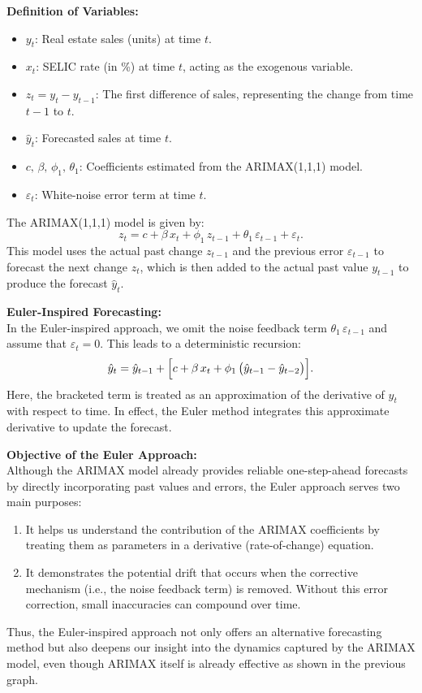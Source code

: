 \documentclass{article}
\begin{document}
\textbf{Definition of Variables:}
\begin{itemize}
    \item \(y_t\): Real estate sales (units) at time \(t\).
    \item \(x_t\): SELIC rate (in \%) at time \(t\), acting as the exogenous variable.
    \item \(z_t = y_t - y_{t-1}\): The first difference of sales, representing the change from time \(t-1\) to \(t\).
    \item \(\hat{y}_t\): Forecasted sales at time \(t\).
    \item \(c,\,\beta,\,\phi_1,\,\theta_1\): Coefficients estimated from the ARIMAX(1,1,1) model.
    \item \(\varepsilon_t\): White-noise error term at time \(t\).
\end{itemize}


The ARIMAX(1,1,1) model is given by:
\[
z_t = c + \beta\,x_t + \phi_1\,z_{t-1} + \theta_1\,\varepsilon_{t-1} + \varepsilon_t.
\]
This model uses the actual past change \(z_{t-1}\) and the previous error \(\varepsilon_{t-1}\) to forecast the next change \(z_t\), which is then added to the actual past value \(y_{t-1}\) to produce the forecast \(\hat{y}_t\).

\textbf{Euler-Inspired Forecasting:}\\[1mm]
In the Euler-inspired approach, we omit the noise feedback term \(\theta_1\,\varepsilon_{t-1}\) and assume that \(\varepsilon_t = 0\). This leads to a deterministic recursion:
\[
\hat{y}_t = \hat{y}_{t-1} + \Bigl[c + \beta\,x_t + \phi_1\,\bigl(\hat{y}_{t-1} - \hat{y}_{t-2}\bigr)\Bigr].
\]
Here, the bracketed term is treated as an approximation of the derivative of \(y_t\) with respect to time. In effect, the Euler method integrates this approximate derivative to update the forecast.

\textbf{Objective of the Euler Approach:}\\[1mm]
Although the ARIMAX model already provides reliable one-step-ahead forecasts by directly incorporating past values and errors, the Euler approach serves two main purposes:
\begin{enumerate}
    \item It helps us understand the contribution of the ARIMAX coefficients by treating them as parameters in a derivative (rate-of-change) equation.
    \item It demonstrates the potential drift that occurs when the corrective mechanism (i.e., the noise feedback term) is removed. Without this error correction, small inaccuracies can compound over time.
\end{enumerate}
Thus, the Euler-inspired approach not only offers an alternative forecasting method but also deepens our insight into the dynamics captured by the ARIMAX model, even though ARIMAX itself is already effective as shown in the previous graph.
\end{document}

